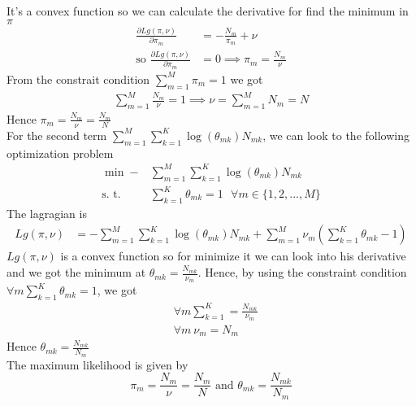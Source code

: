 \documentclass[french]{article}
\begin{document}
It's a convex function so we can calculate the derivative for find the minimum in $\pi$
\begin{align*}
\frac{\partial Lg(\pi,\nu)}{\partial \pi_m} &= -\frac{N_m}{\pi_m} + \nu\\
\text{so } \frac{\partial Lg(\pi,\nu)}{\partial \pi_m}  &= 0 \implies \pi_m = \frac{N_m}{\nu}
\end{align*}
From the constrait condition $\sum_{m=1}^M \pi_m =1$ we got
\begin{align*}
\sum_{m=1}^M \frac{N_m}{\nu} = 1 \implies  \nu = \sum_{m=1}^M N_m = N
\end{align*}
Hence $\pi_m = \frac{N_m}{\nu} = \frac{N_m}{N}$
\bigskip \\
For the second term $ \sum_{m=1}^M  \sum_{k=1}^K\log(\theta_{mk}) N_{mk}$, we can look to the following optimization problem 
\begin{align*}
\min - &\sum_{m=1}^M  \sum_{k=1}^K\log(\theta_{mk}) N_{mk} \\
\text{s. t. } &\sum_{k=1}^K \theta_{mk} = 1 ~~~ \forall m \in \{1,2,...,M\}
\end{align*}
The lagragian is
\begin{align*}
Lg(\pi,\nu) &= - \sum_{m=1}^M  \sum_{k=1}^K\log(\theta_{mk}) N_{mk} + \sum_{m=1}^M \nu_m (\sum_{k=1}^K \theta_{mk} - 1)
\end{align*}
$Lg(\pi,\nu)$ is a convex function so for minimize it we can look into his derivative and we got the minimum at $\theta_{mk} = \frac{N_{mk}}{\nu_m}$.
Hence, by using the constraint condition $\forall m \sum_{k=1}^K \theta_{mk} =1$, we got
\begin{align*}
&\forall m \sum_{k=1}^K = \frac{N_{mk}}{\nu_m} \\
&  \forall m ~\nu_m = N_m
\end{align*}
Hence $\theta_{mk} = \frac{N_{mk}}{N_m}$
\bigskip\\
The maximum likelihood is given by 
\begin{equation*}
\boxed{  \pi_m = \frac{N_m}{\nu} = \frac{N_m}{N} \text{ and } \theta_{mk} = \frac{N_{mk}}{N_m} }
\end{equation*}
\end{document}
